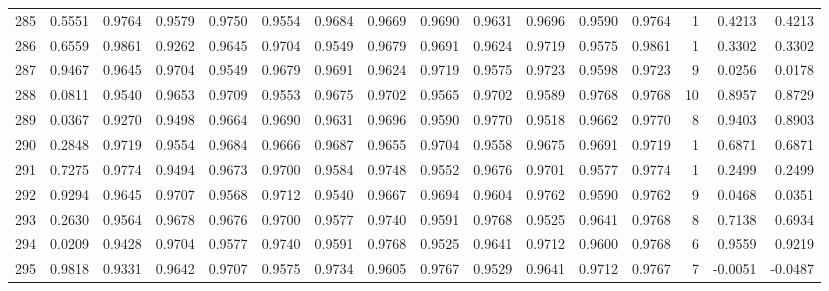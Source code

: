 \begin{tabular}{lrrrrrrrrrrrrrrr}
285 &      0.5551 &  0.9764 &  0.9579 &  0.9750 &  0.9554 &  0.9684 &  0.9669 &  0.9690 &  0.9631 &  0.9696 &   0.9590 &     0.9764 &      1 &                    0.4213 &                     0.4213 \\
286 &      0.6559 &  0.9861 &  0.9262 &  0.9645 &  0.9704 &  0.9549 &  0.9679 &  0.9691 &  0.9624 &  0.9719 &   0.9575 &     0.9861 &      1 &                    0.3302 &                     0.3302 \\
287 &      0.9467 &  0.9645 &  0.9704 &  0.9549 &  0.9679 &  0.9691 &  0.9624 &  0.9719 &  0.9575 &  0.9723 &   0.9598 &     0.9723 &      9 &                    0.0256 &                     0.0178 \\
288 &      0.0811 &  0.9540 &  0.9653 &  0.9709 &  0.9553 &  0.9675 &  0.9702 &  0.9565 &  0.9702 &  0.9589 &   0.9768 &     0.9768 &     10 &                    0.8957 &                     0.8729 \\
289 &      0.0367 &  0.9270 &  0.9498 &  0.9664 &  0.9690 &  0.9631 &  0.9696 &  0.9590 &  0.9770 &  0.9518 &   0.9662 &     0.9770 &      8 &                    0.9403 &                     0.8903 \\
290 &      0.2848 &  0.9719 &  0.9554 &  0.9684 &  0.9666 &  0.9687 &  0.9655 &  0.9704 &  0.9558 &  0.9675 &   0.9691 &     0.9719 &      1 &                    0.6871 &                     0.6871 \\
291 &      0.7275 &  0.9774 &  0.9494 &  0.9673 &  0.9700 &  0.9584 &  0.9748 &  0.9552 &  0.9676 &  0.9701 &   0.9577 &     0.9774 &      1 &                    0.2499 &                     0.2499 \\
292 &      0.9294 &  0.9645 &  0.9707 &  0.9568 &  0.9712 &  0.9540 &  0.9667 &  0.9694 &  0.9604 &  0.9762 &   0.9590 &     0.9762 &      9 &                    0.0468 &                     0.0351 \\
293 &      0.2630 &  0.9564 &  0.9678 &  0.9676 &  0.9700 &  0.9577 &  0.9740 &  0.9591 &  0.9768 &  0.9525 &   0.9641 &     0.9768 &      8 &                    0.7138 &                     0.6934 \\
294 &      0.0209 &  0.9428 &  0.9704 &  0.9577 &  0.9740 &  0.9591 &  0.9768 &  0.9525 &  0.9641 &  0.9712 &   0.9600 &     0.9768 &      6 &                    0.9559 &                     0.9219 \\
295 &      0.9818 &  0.9331 &  0.9642 &  0.9707 &  0.9575 &  0.9734 &  0.9605 &  0.9767 &  0.9529 &  0.9641 &   0.9712 &     0.9767 &      7 &                   -0.0051 &                    -0.0487 \\

\end{tabular}
